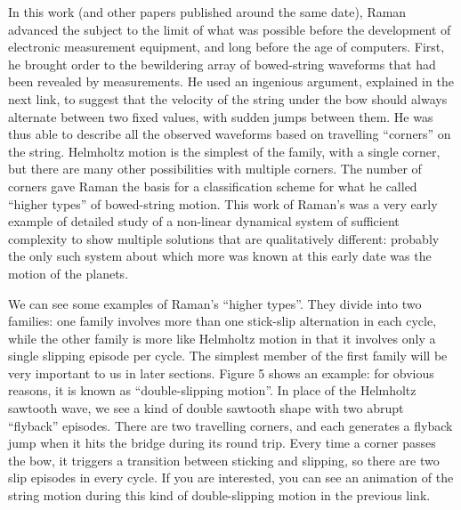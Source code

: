   In this work (and other papers published around the same date), Raman 
  advanced the subject to the limit of what was possible before the development 
  of electronic measurement equipment, and long before the age of computers. 
  First, he brought order to the bewildering array of bowed-string waveforms 
  that had been revealed by measurements. He used an ingenious argument, 
  explained in the next link, to suggest that the velocity of the string under 
  the bow should always alternate between two fixed values, with sudden jumps 
  between them. He was thus able to describe all the observed waveforms based 
  on travelling “corners” on the string. Helmholtz motion is the simplest of 
  the family, with a single corner, but there are many other possibilities with 
  multiple corners. The number of corners gave Raman the basis for a 
  classification scheme for what he called “higher types” of bowed-string 
  motion. This work of Raman’s was a very early example of detailed study of a 
  non-linear dynamical system of sufficient complexity to show multiple 
  solutions that are qualitatively different: probably the only such system 
  about which more was known at this early date was the motion of the planets. 

  We can see some examples of Raman’s “higher types”. They divide into two 
  families: one family involves more than one stick-slip alternation in each 
  cycle, while the other family is more like Helmholtz motion in that it 
  involves only a single slipping episode per cycle. The simplest member of the 
  first family will be very important to us in later sections. Figure 5 shows 
  an example: for obvious reasons, it is known as “double-slipping motion”. In 
  place of the Helmholtz sawtooth wave, we see a kind of double sawtooth shape 
  with two abrupt “flyback” episodes. There are two travelling corners, and 
  each generates a flyback jump when it hits the bridge during its round trip. 
  Every time a corner passes the bow, it triggers a transition between sticking 
  and slipping, so there are two slip episodes in every cycle. If you are 
  interested, you can see an animation of the string motion during this kind of 
  double-slipping motion in the previous link. 

